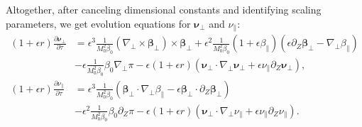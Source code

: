 \documentclass{article}
\newcommand{\para}{\parallel}
\newcommand{\ep}{\epsilon}
\newcommand{\np}{\nabla_\perp}
\newcommand{\p}{\partial}
\newcommand{\deriv}[2]{\frac{\p #1}{\p #2}}
\newcommand{\pth} [1] {\left( #1 \right) }
\begin{document}
Altogether, after canceling dimensional constants and identifying scaling parameters, we get evolution equations for $\bm{\nu}_\perp$ and $\nu_\para$:  
\begin{align}
    \pth{1+\ep r} \deriv{\bm{\nu}_\perp}{\tau} &= \ep^3 \frac{1}{M_0^2\beta_0} \pth{\np\times\bm{\beta}_\perp}\times\bm{\beta}_\perp + \ep^2\frac{1}{M_0^2\beta_0} \pth{1+\ep\beta_\para} \pth{\ep\p_Z\bm{\beta}_\perp - \np\beta_\para} \nonumber\\ 
    &- \ep\frac{1}{M_0^2\beta_0}\beta_0\np\pi - \ep\pth{1+\ep r} \pth{\bm{\nu}_\perp\cdot\np\bm{\nu}_\perp + \ep\nu_\para\p_Z\bm{\nu}_\perp}, \\ 
    \pth{1+\ep r} \deriv{\nu_\para}{\tau} &= \ep^3\frac{1}{M_0^2\beta_0} \pth{\bm{\beta}_\perp\cdot\np\beta_\para - \ep\bm{\beta}_\perp\cdot\p_Z\bm{\beta}_\perp} \nonumber\\ 
    &- \ep^2\frac{1}{M_0^2\beta_0}\beta_0 \p_Z\pi - \ep\pth{1+\ep r} \pth{\bm{\nu}_\perp\cdot\np\nu_\para + \ep \nu_\para\p_Z\nu_\para}.
\end{align}
\end{document}
